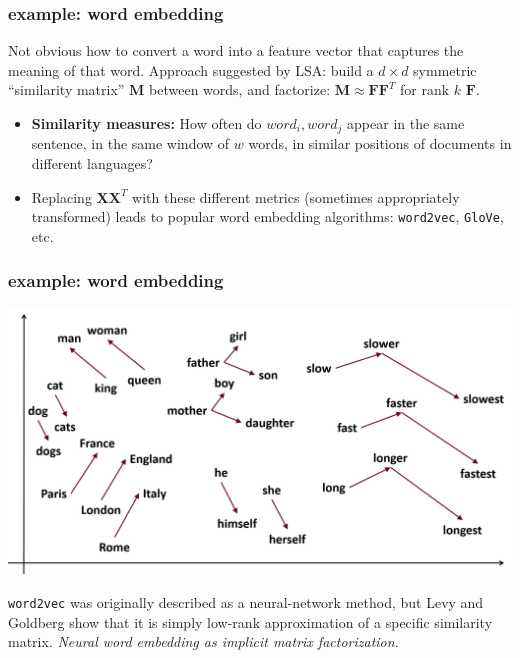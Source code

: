 \documentclass[handout,compress]{beamer}
\newcommand{\bv}[1]{\mathbf{#1}}
\begin{document}
\begin{frame}
	\frametitle{example: word embedding}
	Not obvious how to convert a word into a feature vector that captures the meaning of that word. Approach suggested by LSA: build a $d\times d$ symmetric ``similarity matrix'' $\bv{M}$ between words, and factorize: $\bv{M} \approx \bv{FF}^T$ for rank $k$ $\bv{F}$. 
	\vspace{5em}
	\begin{itemize}
		\item \textbf{Similarity measures:} How often do $word_i,word_j$ appear in the same sentence, in the same window of $w$ words, in similar positions of documents in different languages?
		\item Replacing $\bv{XX}^T$ with these different metrics (sometimes appropriately transformed) leads to popular word embedding algorithms: \texttt{word2vec}, \texttt{GloVe}, etc.
	\end{itemize}
\end{frame}

\begin{frame}
	\frametitle{example: word embedding}
	\begin{center}
		\includegraphics[width=.8\textwidth]{word2vec.png}
	\end{center}
	\begin{center}
		\texttt{word2vec} was originally described as a neural-network method, but Levy and Goldberg show that it is simply low-rank approximation of a specific similarity matrix. \textit{Neural word embedding as implicit matrix factorization.}
	\end{center}
\end{frame}
\end{document}
